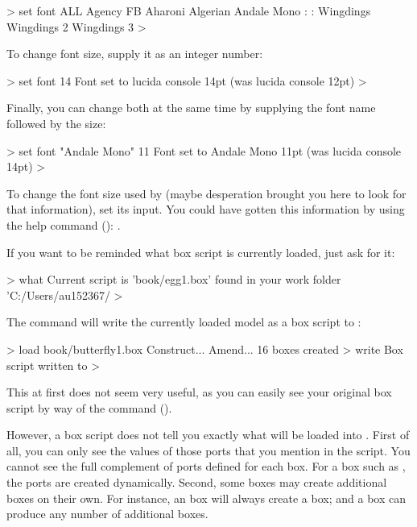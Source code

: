 \begin{usdialog}
> set font ALL
Agency FB
Aharoni
Algerian
Andale Mono
:
:
Wingdings
Wingdings 2
Wingdings 3
> 
\end{usdialog}

To change font size, supply it as an integer number:

\begin{usdialog}
> set font 14
Font set to lucida console 14pt (was lucida console 12pt)
>
\end{usdialog}

Finally, you can change both at the same time by supplying the font name followed by the size:

\begin{usdialog}
> set font "Andale Mono" 11
Font set to Andale Mono 11pt (was lucida console 14pt)
> 
\end{usdialog}

To change the font size used by  (maybe desperation brought you here to look for that information), set its  input. You could have gotten this information by using the help command (): .

If you want to be reminded what box script is currently loaded, just ask for it:
\begin{usdialog}
> what
Current script is 'book/egg1.box'
found in your work folder 'C:/Users/au152367/%
>\end{usdialog}

The  command will write the currently loaded model as a box script to \outputfolderexplained:

\begin{usdialog}
> load book/butterfly1.box
Construct...
Amend...
16 boxes created
> write
Box script written to %
>\end{usdialog}

This at first does not seem very useful, as you can easily see your original box script by way of the  command ().

However, a box script does not tell you exactly what will be loaded into \US. First of all, you can only see the values of those ports that you mention in the script. You cannot see the full complement of ports defined for each box. For a box such as , the ports are created dynamically. Second, some boxes may create additional boxes on their own. For instance, an  box will always create a  box; and a  box can produce any number of additional boxes.

